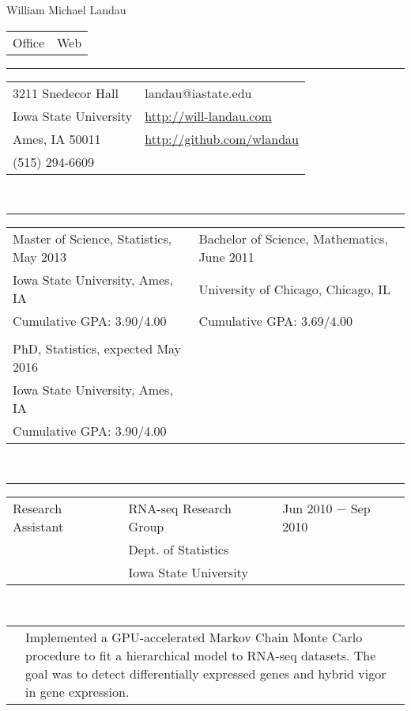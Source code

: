 \documentclass{article}
\newcommand{\q}{$\quad$ \newline}
\newcommand{\vl}{4.25}
\newcommand{\wl}{8.4}
\newcommand{\ww}{13}
\newcommand{\myrule}{\noindent \rule{\textwidth}{1pt}}
\begin{document}
\begin{center}
\LARGE William Michael Landau
\end{center}

\noindent \begin{tabular}{@{}p{13cm}l@{}}
\LARGE Office & \LARGE Web 
\end{tabular}

\myrule

\noindent \begin{tabular}{@{}p{13cm}l@{}}
3211 Snedecor Hall & landau@iastate.edu \\
Iowa State University & \href{http://will-landau.com/}{http://will-landau.com} \\
Ames, IA 50011 & \href{http://github.com/wlandau}{http://github.com/wlandau} \\
(515) 294-6609
\end{tabular} \q \q \q


\myrule

\noindent \begin{tabular}{@{}p{9cm}l@{}}
Master of Science, Statistics, May 2013 &  Bachelor of Science, Mathematics, June 2011   \\
 Iowa State University, Ames, IA  & University of Chicago, Chicago, IL  \\ 
Cumulative GPA: 3.90/4.00 & Cumulative GPA: 3.69/4.00 \\
 & \\
PhD, Statistics, expected May 2016 & \\
Iowa State University, Ames, IA  & \\
Cumulative GPA: 3.90/4.00 \\
\end{tabular} \q \q \q


\myrule

\noindent \begin{tabular}{@{}p{\vl cm}p{\wl cm}l@{}}
Research Assistant & RNA-seq Research Group & Jun 2010 $-$ Sep 2010  \\ 
 &Dept. of Statistics&  \\ 
 &Iowa State University&
\end{tabular} \q \q

\noindent \begin{tabular}{@{}p{\vl cm}p{\ww cm}@{}}
&Implemented a GPU-accelerated Markov Chain Monte Carlo
procedure to fit a hierarchical model to RNA-seq datasets. The goal was to detect 
differentially expressed genes and hybrid vigor in gene expression.
\end{tabular} \q \q
\end{document}
